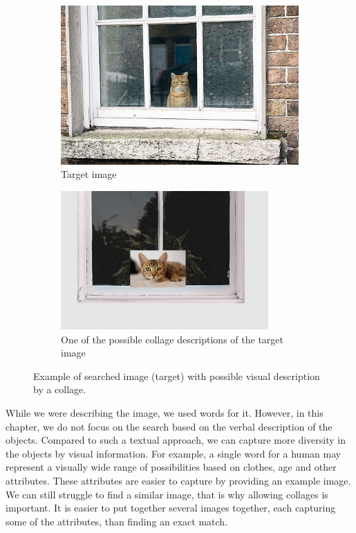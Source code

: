 \begin{figure}
\centering

\begin{subfigure}[t]{0.48\textwidth}
\includegraphics[width=0.95\linewidth]{img/cat_on_window} 
\caption{Target image}
\label{fig:searched_scene}
\end{subfigure}
\begin{subfigure}[t]{0.48\textwidth}
\includegraphics[width=0.95\linewidth]{img/cat_on_window_collage}
\caption{One of the possible collage descriptions of the target image}
\label{fig:collage_example}
\end{subfigure}

\caption{Example of searched image (target) with possible visual description by a collage.}
\label{fig:query_collage_comparison}
\end{figure}

While we were describing the image, we used words for it. However, in this chapter, we do not focus on the search based on the verbal description of the objects. Compared to such a textual approach, we can capture more diversity in the objects by visual information. For example, a single word for a human may represent a visually wide range of possibilities based on clothes, age and other attributes. These attributes are easier to capture by providing an example image. We can still struggle to find a similar image, that is why allowing collages is important. It is easier to put together several images together, each capturing some of the attributes, than finding an exact match.

